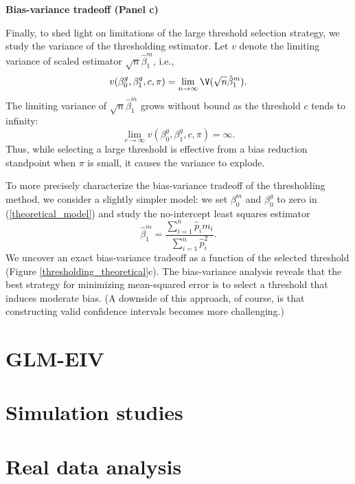 \documentclass[12pt]{article}
\begin{document}
\begin{center}
	\textbf{Bias-variance tradeoff (Panel c)}
\end{center}

Finally, to shed light on limitations of the large threshold selection strategy, we study the variance of the thresholding estimator. Let $v$ denote the limiting variance of scaled estimator $\sqrt{n} \hat{\beta}^m_1$, i.e.,
$$v(\beta^g_0, \beta^g_1, c, \pi) = \lim_{n \to \infty} \V(\sqrt{n} \hat{\beta}^m_1).$$ The limiting variance of $\sqrt{n} \hat{\beta}^m_1$ grows without bound as the threshold $c$ tends to infinity: 
$$ \lim_{c \to \infty} v(\beta^g_0, \beta^g_1, c, \pi) = \infty.$$ Thus, while selecting a large threshold is effective from a bias reduction standpoint when $\pi$ is small, it causes the variance to explode.

To more precisely characterize the bias-variance tradeoff of the thresholding method, we consider a slightly simpler model: we set $\beta^m_0$ and $\beta^g_0$ to zero in (\ref{theoretical_model}) and study the no-intercept least squares estimator
$$ \hat{\beta}^m_1 =  \frac{ \sum_{i=1}^n \hat{p}_i m_i }{ \sum_{i=1}^n \hat{p}_i^2}.$$ We uncover an exact bias-variance tradeoff as a function of the selected threshold (Figure \ref{thresholding_theoretical}c). The bias-variance analysis reveals that the best strategy for minimizing mean-squared error is to select a threshold that induces moderate bias. (A downside of this approach, of course, is that constructing valid confidence intervals becomes more challenging.)



\section{GLM-EIV}

\section{Simulation studies}

\section{Real data analysis}
\end{document}
